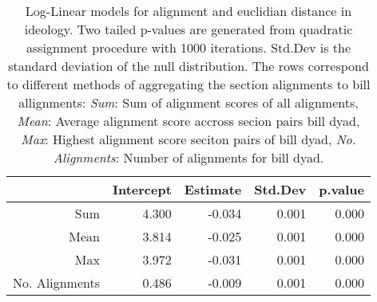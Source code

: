 \begin{table}[ht]
\centering
\begin{tabular}{rrrrr}
  \hline
 & Intercept & Estimate & Std.Dev & p.value \\ 
  \hline
Sum & 4.300 & -0.034 & 0.001 & 0.000 \\ 
  Mean & 3.814 & -0.025 & 0.001 & 0.000 \\ 
  Max & 3.972 & -0.031 & 0.001 & 0.000 \\ 
  No. Alignments & 0.486 & -0.009 & 0.001 & 0.000 \\ 
   \hline
\end{tabular}
\caption{Log-Linear models for alignment and euclidian
distance in ideology. Two tailed p-values are generated from quadratic
assignment procedure with 1000 iterations. Std.Dev is the standard
deviation of the null distribution. The rows correspond to
different methods of aggregating the section alignments to bill
allignments: \textit{Sum}: Sum of alignment scores of all alignments,
\textit{Mean}: Average alignment score accross secion pairs bill dyad,
\textit{Max}: Highest alignment score seciton pairs of bill dyad,
\textit{No. Alignments}: Number of alignments for bill dyad.} 
\label{tab:ideology_regs}
\end{table}
